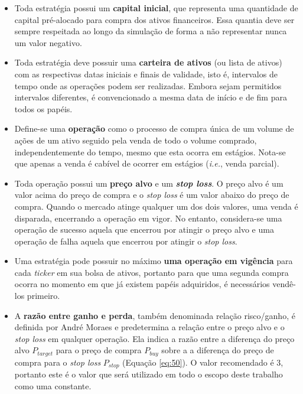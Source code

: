 \begin{itemize}
    \item Toda estratégia possui um \textbf{capital inicial}, que representa uma quantidade de capital pré-alocado para compra dos ativos financeiros. Essa quantia deve ser sempre respeitada ao longo da simulação de forma a não representar nunca um valor negativo.

    \item Toda estratégia deve possuir uma \textbf{carteira de ativos} (ou lista de ativos) com as respectivas datas iniciais e finais de validade, isto é, intervalos de tempo onde as operações podem ser realizadas. Embora sejam permitidos intervalos diferentes, é convencionado a mesma data de início e de fim para todos os papéis.

    \item Define-se uma  \textbf{operação} como o processo de compra única de um volume de ações de um ativo seguido pela venda de todo o volume comprado, independentemente do tempo, mesmo que esta ocorra em estágios. Nota-se que apenas a venda é cabível de ocorrer em estágios (\textit{i.e.}, venda parcial).

    \item Toda operação possui um \textbf{preço alvo} e um \textbf{\textit{stop loss}}. O preço alvo é um valor acima do preço de compra e o \textit{stop loss} é um valor abaixo do preço de compra. Quando o mercado atinge qualquer um dos dois valores, uma venda é disparada, encerrando a operação em vigor. No entanto, considera-se uma operação de sucesso aquela que encerrou por atingir o preço alvo e uma operação de falha aquela que encerrou por atingir o \textit{stop loss}.

    \item Uma estratégia pode possuir no máximo \textbf{uma operação em vigência} para cada \textit{ticker} em sua bolsa de ativos, portanto para que uma segunda compra ocorra no momento em que já existem papéis adquiridos, é necessários vendê-los primeiro.


    \item A \textbf{razão entre ganho e perda}, também denominada relação risco/ganho, é definida por André Moraes \cite{moraes2007se} e predetermina a relação entre o preço alvo e o \textit{stop loss} em qualquer operação. Ela indica a razão entre a diferença do preço alvo \begin{math} P_{target} \end{math} para o preço de compra \begin{math} P_{buy} \end{math} sobre a a diferença do preço de compra para o \textit{stop loss} \begin{math} P_{stop} \end{math} (Equação \ref{eq:50}). O valor recomendado é 3, portanto este é o valor que será utilizado em todo o escopo deste trabalho como uma constante.


\end{itemize}
